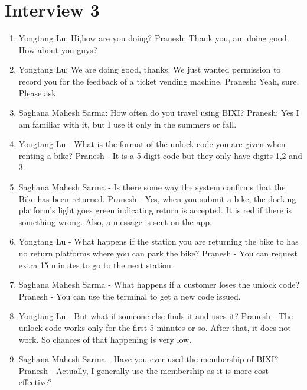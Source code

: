 \section{Interview 3}
\begin{enumerate}
    \item Yongtang Lu: Hi,how are you doing?
    \newline Pranesh: Thank you, am doing good. How about you guys?
    \item Yongtang Lu:  We are doing good, thanks. We just wanted permission to record you for the feedback of a ticket vending machine.
    \newline Pranesh: Yeah, sure. Please ask
    \item Saghana Mahesh Sarma: How often do you travel using BIXI?
    \newline Pranesh: Yes I am familiar with it, but I use it only in the summers or fall.
    \item Yongtang Lu - What is the format of the unlock code you are given when renting a bike?
    \newline Pranesh - It is a 5 digit code but they only have digits 1,2 and 3.
    \item Saghana Mahesh Sarma - Is there some way the system confirms that the Bike has been returned.
    \newline Pranesh - Yes, when you submit a bike, the docking platform’s light goes green indicating return is accepted. It is red if there is something wrong. Also, a message is sent on the app.
    \item Yongtang Lu - What happens if the station you are returning the bike to has no return platforms where you can park the bike?
    \newline Pranesh - You can request extra 15 minutes to go to the next station.
    \item Saghana Mahesh Sarma - What happens if a customer loses the unlock code?
    \newline Pranesh - You can use the terminal to get a new code issued.
    \item Yongtang Lu - But what if someone else finds it and uses it?
    \newline Pranesh - The unlock code works only for the first 5 minutes or so. After that, it does not work. So chances of that happening is very low.
    \item Saghana Mahesh Sarma - Have you ever used the membership of BIXI?
    \newline Pranesh - Actually, I generally use the membership as it is more cost effective?

\end{enumerate}
